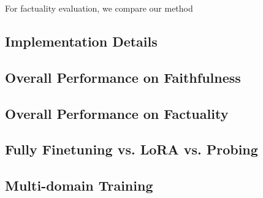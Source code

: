 For factuality evaluation, we compare our method

\subsection{Implementation Details}

\subsection{Overall Performance on Faithfulness}

\subsection{Overall Performance on Factuality}

\subsection{Fully Finetuning vs. LoRA vs. Probing}

\subsection{Multi-domain Training}

